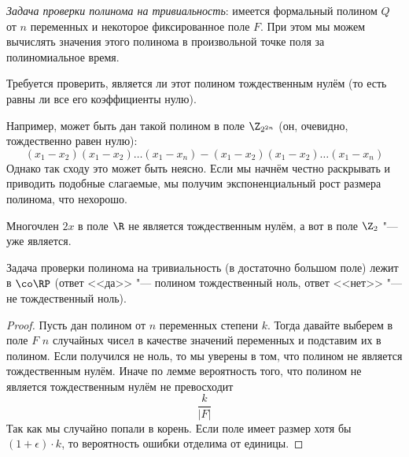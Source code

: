 	\begin{Def}
		\textit{Задача проверки полинома на тривиальность}: имеется формальный полином $Q$ от $n$ переменных и некоторое фиксированное поле $F$.
		При этом мы можем вычислять значения этого полинома в произвольной точке поля за полиномиальное время.

		Требуется проверить, является ли этот полином тождественным нулём (то есть равны ли все его коэффициенты нулю).
	\end{Def}
	\begin{exmp}
		Например, может быть дан такой полином в поле $\Z_{2^{2n}}$ (он, очевидно, тождественно равен нулю):
		\[
			(x_1-x_2)(x_1-x_2)\dots (x_1-x_n) - (x_1-x_2)(x_1-x_2)\dots (x_1-x_n)
		\]
		Однако так сходу это может быть неясно.
		Если мы начнём честно раскрывать и приводить подобные слагаемые, мы получим экспоненциальный рост размера полинома, что нехорошо.
	\end{exmp}
	\begin{Rem}
		Многочлен $2x$ в поле $\R$ не является тождественным нулём, а вот в поле $\Z_2$ "--- уже является.
	\end{Rem}
	\begin{assertion}
		Задача проверки полинома на тривиальность (в достаточно большом поле) лежит в $\co\RP$ (ответ <<да>> "--- полином тождественный ноль, ответ <<нет>> "--- не тождественный ноль).
	\end{assertion}
	\begin{proof}
		Пусть дан полином от $n$ переменных степени $k$.
		Тогда давайте выберем в поле $F$ $n$ случайных чисел в качестве значений переменных и подставим их в полином.
		Если получился не ноль, то мы уверены в том, что полином не является тождественным нулём.
		Иначе по лемме вероятность того, что полином не является тождественным нулём не превосходит
		\[
			\frac{k}{|F|}
		\]
		Так как мы случайно попали в корень.
		Если поле имеет размер хотя бы $(1+\epsilon) \cdot k$, то вероятность ошибки отделима от единицы.
	\end{proof}
